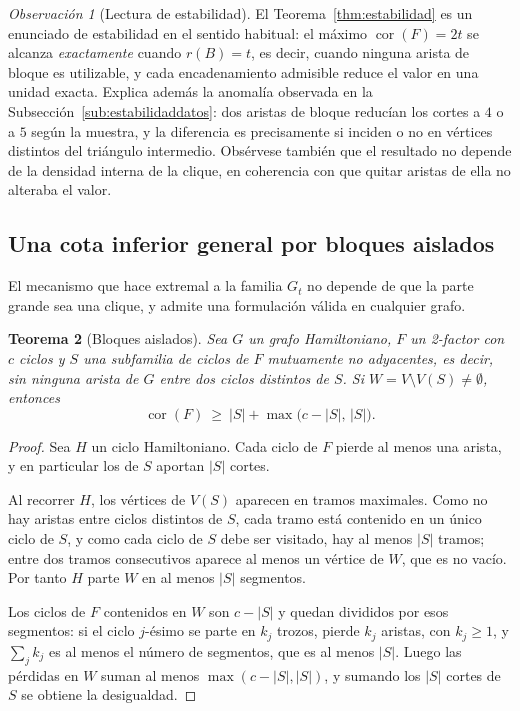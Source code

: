 \documentclass[11pt,a4paper]{article}
\newtheorem{teorema}{Teorema}[section]
\theoremstyle{definition}
\theoremstyle{remark}
\newtheorem{observacion}[teorema]{Observación}
\begin{document}
\begin{observacion}[Lectura de estabilidad]\label{obs:lecturaestab}
El Teorema~\ref{thm:estabilidad} es un enunciado de estabilidad en el sentido habitual: el máximo $\operatorname{cor}(F)=2t$ se alcanza \emph{exactamente} cuando $r(B)=t$, es decir, cuando ninguna arista de bloque es utilizable, y cada encadenamiento admisible reduce el valor en una unidad exacta. Explica además la anomalía observada en la Subsección~\ref{sub:estabilidaddatos}: dos aristas de bloque reducían los cortes a $4$ o a $5$ según la muestra, y la diferencia es precisamente si inciden o no en vértices distintos del triángulo intermedio. Obsérvese también que el resultado no depende de la densidad interna de la clique, en coherencia con que quitar aristas de ella no alteraba el valor.
\end{observacion}



\subsection{Una cota inferior general por bloques aislados}\label{sub:bloquesgeneral}

El mecanismo que hace extremal a la familia $G_t$ no depende de que la parte grande sea una clique, y admite una formulación válida en cualquier grafo.

\begin{teorema}[Bloques aislados]\label{thm:bloques}
Sea $G$ un grafo Hamiltoniano, $F$ un 2-factor con $c$ ciclos y $S$ una subfamilia de ciclos de $F$ \emph{mutuamente no adyacentes}, es decir, sin ninguna arista de $G$ entre dos ciclos distintos de $S$. Si $W=V\setminus V(S)\neq\emptyset$, entonces
\[
\operatorname{cor}(F)\ \ge\ |S|+\max\big(c-|S|,\,|S|\big).
\]
\end{teorema}

\begin{proof}
Sea $H$ un ciclo Hamiltoniano. Cada ciclo de $F$ pierde al menos una arista, y en particular los de $S$ aportan $|S|$ cortes.

Al recorrer $H$, los vértices de $V(S)$ aparecen en tramos maximales. Como no hay aristas entre ciclos distintos de $S$, cada tramo está contenido en un único ciclo de $S$, y como cada ciclo de $S$ debe ser visitado, hay al menos $|S|$ tramos; entre dos tramos consecutivos aparece al menos un vértice de $W$, que es no vacío. Por tanto $H$ parte $W$ en al menos $|S|$ segmentos.

Los ciclos de $F$ contenidos en $W$ son $c-|S|$ y quedan divididos por esos segmentos: si el ciclo $j$-ésimo se parte en $k_j$ trozos, pierde $k_j$ aristas, con $k_j\ge1$, y $\sum_j k_j$ es al menos el número de segmentos, que es al menos $|S|$. Luego las pérdidas en $W$ suman al menos $\max(c-|S|,|S|)$, y sumando los $|S|$ cortes de $S$ se obtiene la desigualdad.
\end{proof}
\end{document}
